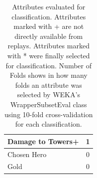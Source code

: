 \begin{table}[]
\begin{tabular}{|l|c|}
\rowcolor[HTML]{FFFFC7} 
Damage to Towers+                                                & 1                        \\ \hline
Chosen Hero                                                      & 0                        \\ \hline
\rowcolor[HTML]{FFFFC7} 
Gold                                                             & 0                        \\ \hline
\end{tabular}
\caption{Attributes evaluated for classification. Attributes marked with + are not directly
available from replays. Attributes marked with {*} were finally selected for classification.
Number of Folds shows in how many folds an attribute was selected by WEKA’s
WrapperSubsetEval class using 10-fold cross-validation for each classification.}
\label{table:table1}
\end{table}